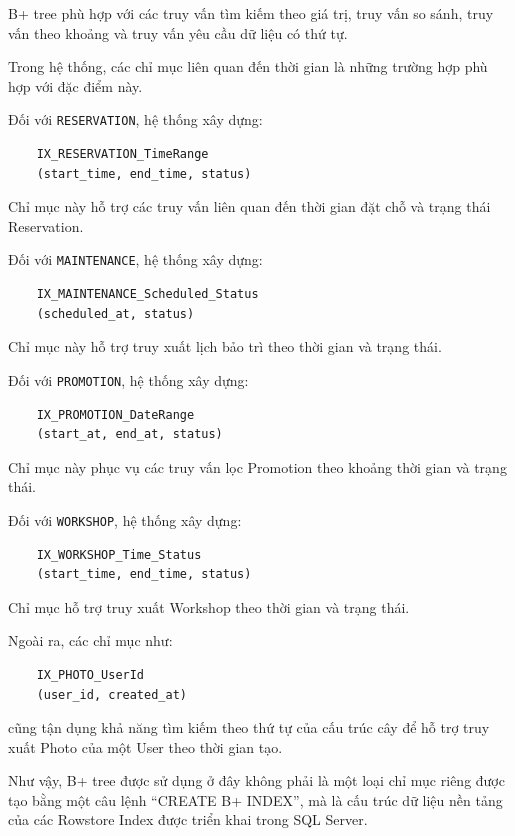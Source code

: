 B+ tree phù hợp với các truy vấn tìm kiếm theo giá trị, truy vấn so sánh,
truy vấn theo khoảng và truy vấn yêu cầu dữ liệu có thứ tự.

Trong hệ thống, các chỉ mục liên quan đến thời gian là những trường hợp
phù hợp với đặc điểm này.

Đối với \texttt{RESERVATION}, hệ thống xây dựng:

\begin{verbatim}
	IX_RESERVATION_TimeRange
	(start_time, end_time, status)
\end{verbatim}

Chỉ mục này hỗ trợ các truy vấn liên quan đến thời gian đặt chỗ và trạng
thái Reservation.

Đối với \texttt{MAINTENANCE}, hệ thống xây dựng:

\begin{verbatim}
	IX_MAINTENANCE_Scheduled_Status
	(scheduled_at, status)
\end{verbatim}

Chỉ mục này hỗ trợ truy xuất lịch bảo trì theo thời gian và trạng thái.

Đối với \texttt{PROMOTION}, hệ thống xây dựng:

\begin{verbatim}
	IX_PROMOTION_DateRange
	(start_at, end_at, status)
\end{verbatim}

Chỉ mục này phục vụ các truy vấn lọc Promotion theo khoảng thời gian và
trạng thái.

Đối với \texttt{WORKSHOP}, hệ thống xây dựng:

\begin{verbatim}
	IX_WORKSHOP_Time_Status
	(start_time, end_time, status)
\end{verbatim}

Chỉ mục hỗ trợ truy xuất Workshop theo thời gian và trạng thái.

Ngoài ra, các chỉ mục như:

\begin{verbatim}
	IX_PHOTO_UserId
	(user_id, created_at)
\end{verbatim}

cũng tận dụng khả năng tìm kiếm theo thứ tự của cấu trúc cây để hỗ trợ
truy xuất Photo của một User theo thời gian tạo.

Như vậy, B+ tree được sử dụng ở đây không phải là một loại chỉ mục riêng
được tạo bằng một câu lệnh ``CREATE B+ INDEX'', mà là cấu trúc dữ liệu nền
tảng của các Rowstore Index được triển khai trong SQL Server.

